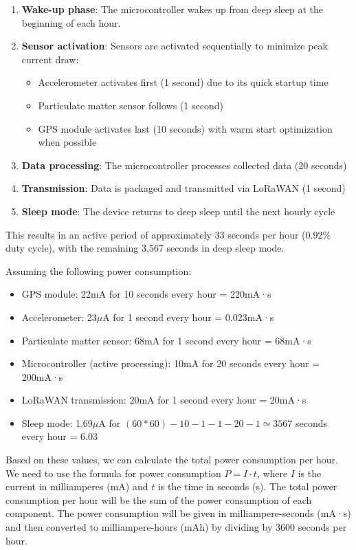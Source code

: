 \begin{enumerate}
  \item \textbf{Wake-up phase}: The microcontroller wakes up from deep sleep at the beginning of each hour.
  \item \textbf{Sensor activation}: Sensors are activated sequentially to minimize peak current draw:
  \begin{itemize}
    \item Accelerometer activates first (1 second) due to its quick startup time
    \item Particulate matter sensor follows (1 second) 
    \item GPS module activates last (10 seconds) with warm start optimization when possible
  \end{itemize}  \item \textbf{Data processing}: The microcontroller processes collected data (20 seconds)
  \item \textbf{Transmission}: Data is packaged and transmitted via LoRaWAN (1 second)
  \item \textbf{Sleep mode}: The device returns to deep sleep until the next hourly cycle
\end{enumerate}

This results in an active period of approximately 33 seconds per hour (0.92\% duty cycle), with the remaining 3,567 seconds in deep sleep mode.

Assuming the following power consumption:
\begin{itemize}
  \item GPS module: 22mA for 10 seconds every hour = 220mA·s
  \item Accelerometer: 23$\mu$A for 1 second every hour = 0.023mA·s
  \item Particulate matter sensor: 68mA for 1 second every hour = 68mA·s
  \item Microcontroller (active processing): 10mA for 20 seconds every hour = 200mA·s
  \item LoRaWAN transmission: 20mA for 1 second every hour = 20mA·s
  \item Sleep mode: 1.69$\mu$A for $(60*60) - 10 - 1 - 1 - 20 - 1 \simeq 3567$ seconds every hour = 6.03
\end{itemize}

Based on these values, we can calculate the total power consumption per hour.
We need to use the formula for power consumption $P = I \cdot t$, where $I$ is the current in milliamperes (mA) and $t$ is the time in seconds (s). The total power consumption per hour will be the sum of the power consumption of each component. The power consumption will be given in milliampere-seconds (mA·s) and then converted to milliampere-hours (mAh) by dividing by 3600 seconds per hour.

